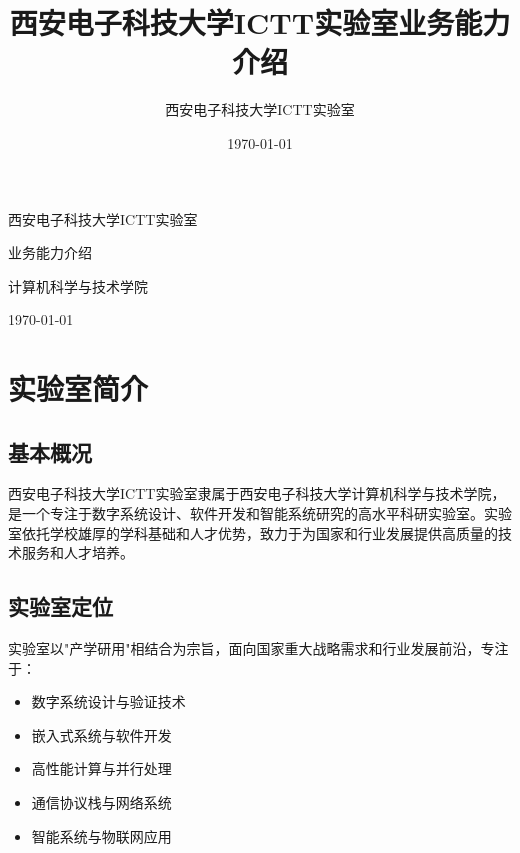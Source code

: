 \documentclass[fontset=windows]{article}
\title{\heiti\zihao{2} 西安电子科技大学ICTT实验室业务能力介绍}
\author{\songti 西安电子科技大学ICTT实验室}
\date{\today}
\begin{document}
\begin{titlepage}
    \centering
    \vspace*{3cm}
    {\heiti{} 西安电子科技大学ICTT实验室\par}
    \vspace{1cm}
    {\heiti{} 业务能力介绍\par}
    \vspace{3cm}
    {\songti{} 计算机科学与技术学院\par}
    \vspace{0.5cm}
    { \today\par}
    \vfill
\end{titlepage}

\clearpage

\pagestyle{main}

\tableofcontents
\clearpage


\section{实验室简介}

\subsection{基本概况}
西安电子科技大学ICTT实验室隶属于西安电子科技大学计算机科学与技术学院，是一个专注于数字系统设计、软件开发和智能系统研究的高水平科研实验室。实验室依托学校雄厚的学科基础和人才优势，致力于为国家和行业发展提供高质量的技术服务和人才培养。

\subsection{实验室定位}
实验室以"产学研用"相结合为宗旨，面向国家重大战略需求和行业发展前沿，专注于：
\begin{itemize}
    \item 数字系统设计与验证技术
    \item 嵌入式系统与软件开发
    \item 高性能计算与并行处理
    \item 通信协议栈与网络系统
    \item 智能系统与物联网应用
\end{itemize}
\end{document}
